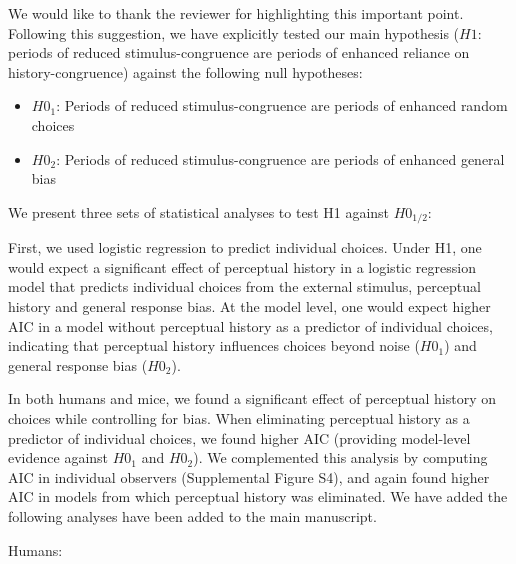 \documentclass[
]{article}
\providecommand{\tightlist}{%
  \setlength{\itemsep}{0pt}\setlength{\parskip}{0pt}}
\begin{document}
We would like to thank the reviewer for highlighting this important
point. Following this suggestion, we have explicitly tested our main
hypothesis (\(H1\): periods of reduced stimulus-congruence are periods
of enhanced reliance on history-congruence) against the following null
hypotheses:

\begin{itemize}
\tightlist
\item
  \(H0_1\): Periods of reduced stimulus-congruence are periods of
  enhanced random choices
\item
  \(H0_2\): Periods of reduced stimulus-congruence are periods of
  enhanced general bias
\end{itemize}

We present three sets of statistical analyses to test H1 against
\(H0_{1/2}\):

First, we used logistic regression to predict individual choices. Under
H1, one would expect a significant effect of perceptual history in a
logistic regression model that predicts individual choices from the
external stimulus, perceptual history and general response bias. At the
model level, one would expect higher AIC in a model without perceptual
history as a predictor of individual choices, indicating that perceptual
history influences choices beyond noise (\(H0_1\)) and general response
bias (\(H0_2\)).

In both humans and mice, we found a significant effect of perceptual
history on choices while controlling for bias. When eliminating
perceptual history as a predictor of individual choices, we found higher
AIC (providing model-level evidence against \(H0_1\) and \(H0_2\)). We
complemented this analysis by computing AIC in individual observers
(Supplemental Figure S4), and again found higher AIC in models from
which perceptual history was eliminated. We have added the following
analyses have been added to the main manuscript.

Humans:
\end{document}
